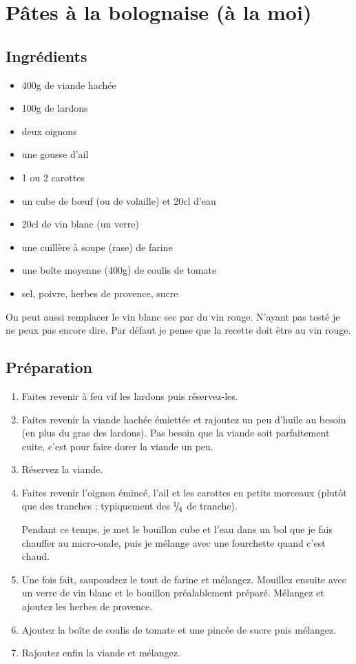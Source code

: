 \newpage
\section{Pâtes à la bolognaise (à la moi)}
\subsection*{Ingrédients}
\begin{itemize}
\item 400g de viande hachée
\item 100g de lardons
\item deux oignons
\item une gousse d'ail
\item 1 ou 2 carottes
\item un cube de bœuf (ou de volaille) et 20cl d'eau
\item 20cl de vin blanc (un verre)
\item une cuillère à soupe (rase) de farine
\item une boîte moyenne (400g) de coulis de tomate
\item sel, poivre, herbes de provence, sucre
\end{itemize}

\begin{remarque}
On peut aussi remplacer le vin blanc sec par du vin rouge. N'ayant pas testé je ne peux pas encore dire. Par défaut je pense que la recette doit être au vin rouge.
\end{remarque}


\subsection*{Préparation}
\begin{enumerate}
\item Faites revenir à feu vif les lardons puis réservez-les.
\item Faites revenir la viande hachée émiettée et rajoutez un peu d'huile au besoin (en plus du gras des lardons). Pas besoin que la viande soit parfaitement cuite, c'est pour faire dorer la viande un peu.
\item Réservez la viande.
\item Faites revenir l'oignon émincé, l'ail et les carottes en petits morceaux (plutôt que des tranches ; typiquement des ${{}^{1\!\!}/ _{\!4}}$ de tranche).
\begin{remarque}
Pendant ce temps, je met le bouillon cube et l'eau dans un bol que je fais chauffer au micro-onde, puis je mélange avec une fourchette quand c'est chaud.
\end{remarque}
\item Une fois fait, saupoudrez le tout de farine et mélangez. Mouillez ensuite avec un verre de vin blanc et le bouillon préalablement préparé. Mélangez et ajoutez les herbes de provence.
\item Ajoutez la boîte de coulis de tomate et une pincée de sucre puis mélangez.
\item Rajoutez enfin la viande et mélangez.
\end{enumerate}

